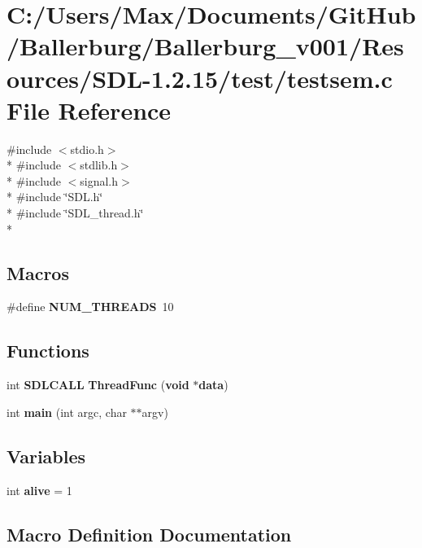 \section{C\+:/\+Users/\+Max/\+Documents/\+Git\+Hub/\+Ballerburg/\+Ballerburg\+\_\+v001/\+Resources/\+S\+D\+L-\/1.2.15/test/testsem.c File Reference}
\label{testsem_8c}
{\ttfamily \#include $<$stdio.\+h$>$}\\*
{\ttfamily \#include $<$stdlib.\+h$>$}\\*
{\ttfamily \#include $<$signal.\+h$>$}\\*
{\ttfamily \#include \char`\"{}S\+D\+L.\+h\char`\"{}}\\*
{\ttfamily \#include \char`\"{}S\+D\+L\+\_\+thread.\+h\char`\"{}}\\*
\subsection*{Macros}
\begin{DoxyCompactItemize}
\item 
\#define {\bf N\+U\+M\+\_\+\+T\+H\+R\+E\+A\+D\+S}~10
\end{DoxyCompactItemize}
\subsection*{Functions}
\begin{DoxyCompactItemize}
\item 
int {\bf S\+D\+L\+C\+A\+L\+L} {\bf Thread\+Func} ({\bf void} $\ast${\bf data})
\item 
int {\bf main} (int argc, char $\ast$$\ast$argv)
\end{DoxyCompactItemize}
\subsection*{Variables}
\begin{DoxyCompactItemize}
\item 
int {\bf alive} = 1
\end{DoxyCompactItemize}


\subsection{Macro Definition Documentation}
